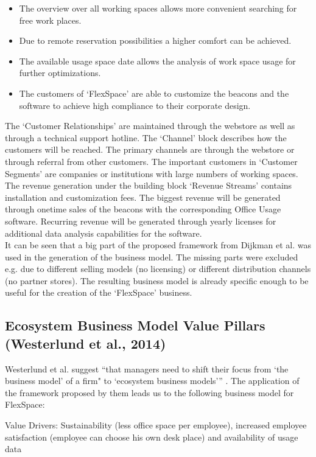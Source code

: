 	\begin{itemize}
		\item The overview over all working spaces allows more convenient searching for free work places.
		\item Due to remote reservation possibilities a higher comfort can be achieved. 
		\item The available usage space date allows the analysis of work space usage for further optimizations.
		\item The customers of `FlexSpace' are able to customize the beacons and the software to achieve high compliance to their corporate design.  
	\end{itemize}  

	The `Customer Relationships' are maintained through the webstore as well as through a technical support hotline. The `Channel' block describes how the customers will be reached. The primary channels are through the webstore or through referral from other customers. The important customers in `Customer Segments' are companies or institutions with large numbers of working spaces. The revenue generation under the building block `Revenue Streams' contains installation and customization fees. The biggest revenue will be generated through onetime sales of the beacons with the corresponding Office Usage software. Recurring revenue will be generated through yearly licenses for additional data analysis capabilities for the software.\\
	It can be seen that a big part of the proposed framework from Dijkman et al. was used in the generation of the business model. The missing parts were excluded e.g. due to different selling models (no licensing) or different distribution channels (no partner stores). The resulting business model is already specific enough to be useful for the creation of the `FlexSpace' business. 

	\subsection{Ecosystem Business Model Value Pillars (Westerlund et al., 2014)}
		Westerlund et al. suggest ``that managers need to shift their focus from `the business model' of a firm" to `ecosystem business models''' \cite[p. 8]{westerlund}. The application of the framework proposed by them leads us to the following business model for FlexSpace:

		Value Drivers: Sustainability (less office space per employee), increased employee satisfaction (employee can choose his own desk place) and availability of usage data

